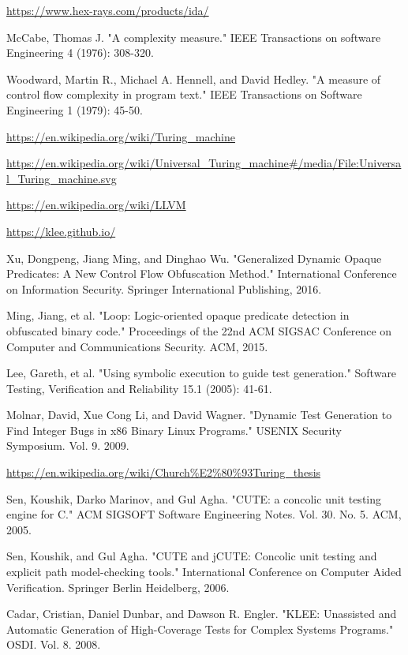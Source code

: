 \documentclass[lnicst]{svmultln}
\begin{document}
\begin{thebibliography}{5}
 \url{https://www.hex-rays.com/products/ida/}

 McCabe, Thomas J. "A complexity measure." IEEE Transactions on software Engineering 4 (1976): 308-320.

 Woodward, Martin R., Michael A. Hennell, and David Hedley. "A measure of control flow complexity in program text." IEEE Transactions on Software Engineering 1 (1979): 45-50.

 \url{https://en.wikipedia.org/wiki/Turing_machine}

 \url{https://en.wikipedia.org/wiki/Universal_Turing_machine#/media/File:Universal_Turing_machine.svg}

 \url{https://en.wikipedia.org/wiki/LLVM}

 \url{https://klee.github.io/}

 Xu, Dongpeng, Jiang Ming, and Dinghao Wu. "Generalized Dynamic Opaque Predicates: A New Control Flow Obfuscation Method." International Conference on Information Security. Springer International Publishing, 2016.

 Ming, Jiang, et al. "Loop: Logic-oriented opaque predicate detection in obfuscated binary code." Proceedings of the 22nd ACM SIGSAC Conference on Computer and Communications Security. ACM, 2015.

 Lee, Gareth, et al. "Using symbolic execution to guide test generation." Software Testing, Verification and Reliability 15.1 (2005): 41-61.

 Molnar, David, Xue Cong Li, and David Wagner. "Dynamic Test Generation to Find Integer Bugs in x86 Binary Linux Programs." USENIX Security Symposium. Vol. 9. 2009.

 \url{https://en.wikipedia.org/wiki/Church%E2%80%93Turing_thesis}

 Sen, Koushik, Darko Marinov, and Gul Agha. "CUTE: a concolic unit testing engine for C." ACM SIGSOFT Software Engineering Notes. Vol. 30. No. 5. ACM, 2005.

 Sen, Koushik, and Gul Agha. "CUTE and jCUTE: Concolic unit testing and explicit path model-checking tools." International Conference on Computer Aided Verification. Springer Berlin Heidelberg, 2006.

 Cadar, Cristian, Daniel Dunbar, and Dawson R. Engler. "KLEE: Unassisted and Automatic Generation of High-Coverage Tests for Complex Systems Programs." OSDI. Vol. 8. 2008.


\end{thebibliography}
%
\end{document}
